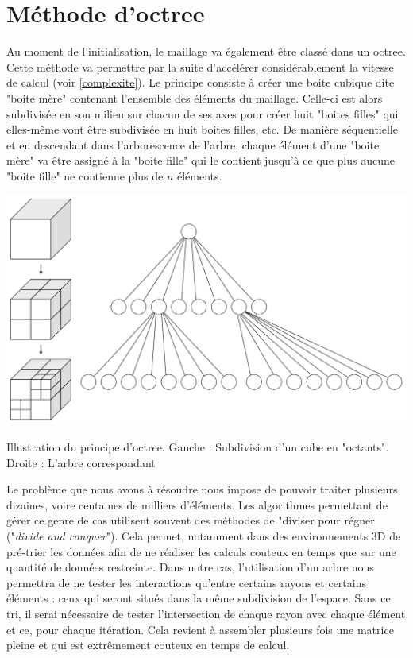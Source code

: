 \section{Méthode d'octree}
Au moment de l'initialisation, le maillage va également être classé dans un \gls{octree}. Cette méthode va permettre par la suite d'accélérer considérablement la vitesse de calcul (voir \ref{complexite}). Le principe consiste à créer une boite cubique dite "boite mère" contenant l'ensemble des éléments du maillage. Celle-ci est alors subdivisée en son milieu sur chacun de ses axes pour créer huit "boites filles" qui elles-même vont être subdivisée en huit boites filles, etc. De manière séquentielle et en descendant dans l'arborescence de l'arbre, chaque élément d'une "boite mère" va être assigné à la "boite fille" qui le contient jusqu'à ce que plus aucune "boite fille" ne contienne plus de $n$ éléments.

\begin{figureth}
	\includegraphics[width=0.6\linewidth]{images/octree}
	\caption{Illustration du principe d'\gls{octree}. Gauche : Subdivision d'un cube en "octants". Droite : L'arbre correspondant}
	\label{octree}
\end{figureth}

Le problème que nous avons à résoudre nous impose de pouvoir traiter plusieurs dizaines, voire centaines de milliers d'éléments. Les algorithmes permettant de gérer ce genre de cas utilisent souvent des méthodes de "diviser pour régner ("\textit{divide and conquer}"). Cela permet, notamment dans des environnements 3D de pré-trier les données afin de ne réaliser les calculs couteux en temps que sur une quantité de données restreinte. Dans notre cas, l'utilisation d'un arbre nous permettra de ne tester les interactions qu'entre certains rayons et certains éléments : ceux qui seront situés dans la même subdivision de l'espace. Sans ce tri, il serai nécessaire de tester l'intersection de chaque rayon avec chaque élément et ce, pour chaque itération. Cela revient à assembler plusieurs fois une matrice pleine et qui est extrêmement couteux en temps de calcul.

